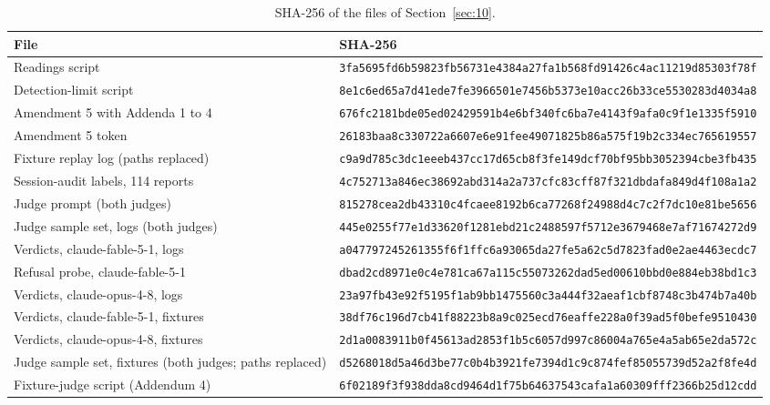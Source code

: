 \documentclass[11pt]{article}
\begin{document}
\begin{table}[!htb]
\caption{SHA-256 of the files of Section~\ref{sec:10}.}\label{tab:25}
\scriptsize
\begin{tabularx}{\linewidth}{@{}Yl@{}}
\toprule
\textbf{File} & \textbf{SHA-256} \\ \midrule
Readings script & \texttt{3fa5695fd6b59823fb56731e4384a27fa1b568fd91426c4ac11219d85303f78f} \\
Detection-limit script & \texttt{8e1c6ed65a7d41ede7fe3966501e7456b5373e10acc26b33ce5530283d4034a8} \\
Amendment 5 with Addenda 1 to 4 & \texttt{676fc2181bde05ed02429591b4e6bf340fc6ba7e4143f9afa0c9f1e1335f5910} \\
Amendment 5 token & \texttt{26183baa8c330722a6607e6e91fee49071825b86a575f19b2c334ec765619557} \\
Fixture replay log (paths replaced) & \texttt{c9a9d785c3dc1eeeb437cc17d65cb8f3fe149dcf70bf95bb3052394cbe3fb435} \\
Session-audit labels, 114 reports & \texttt{4c752713a846ec38692abd314a2a737cfc83cff87f321dbdafa849d4f108a1a2} \\
Judge prompt (both judges) & \texttt{815278cea2db43310c4fcaee8192b6ca77268f24988d4c7c2f7dc10e81be5656} \\
Judge sample set, logs (both judges) & \texttt{445e0255f77e1d33620f1281ebd21c2488597f5712e3679468e7af71674272d9} \\
Verdicts, claude-fable-5-1, logs & \texttt{a047797245261355f6f1ffc6a93065da27fe5a62c5d7823fad0e2ae4463ecdc7} \\
Refusal probe, claude-fable-5-1 & \texttt{dbad2cd8971e0c4e781ca67a115c55073262dad5ed00610bbd0e884eb38bd1c3} \\
Verdicts, claude-opus-4-8, logs & \texttt{23a97fb43e92f5195f1ab9bb1475560c3a444f32aeaf1cbf8748c3b474b7a40b} \\
Verdicts, claude-fable-5-1, fixtures & \texttt{38df76c196d7cb41f88223b8a9c025ecd76eaffe228a0f39ad5f0befe9510430} \\
Verdicts, claude-opus-4-8, fixtures & \texttt{2d1a0083911b0f45613ad2853f1b5c6057d997c86004a765e4a5ab65e2da572c} \\
Judge sample set, fixtures (both judges; paths replaced) & \texttt{d5268018d5a46d3be77c0b4b3921fe7394d1c9c874fef85055739d52a2f8fe4d} \\
Fixture-judge script (Addendum 4) & \texttt{6f02189f3f938dda8cd9464d1f75b64637543cafa1a60309fff2366b25d12cdd} \\
\bottomrule
\end{tabularx}
\end{table}
\end{document}
